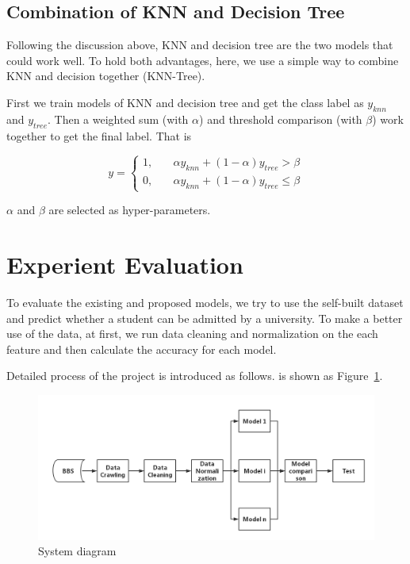 \documentclass{article}
\begin{document}
\subsection{Combination of KNN and Decision Tree}

Following the discussion above, KNN and decision tree are the two models that could work well. To hold both advantages, here, we use a simple way to combine KNN and decision together (KNN-Tree).

First we train models of KNN and decision tree and get the class label as $y_{knn}$ and $y_{tree}$. Then a weighted sum (with $\alpha$) and threshold comparison (with $\beta$) work together to get the final label. That is

\begin{equation*}
    y=\left\{
    \begin{aligned}
        1,\quad & \alpha y_{knn}+(1-\alpha)y_{tree}>\beta\\
        0,\quad & \alpha y_{knn}+(1-\alpha)y_{tree}\le\beta
    \end{aligned}\right.
\end{equation*}

$\alpha$ and $\beta$ are selected as hyper-parameters.


\section{Experient Evaluation}

To evaluate the existing and proposed models, we try to use the self-built dataset and predict whether a student can be admitted by a university. To make a better use of the data, at first, we run data cleaning and normalization on the each feature and then calculate the accuracy for each model.

Detailed process of the project is introduced as follows. is shown as Figure~\ref{fig: Diagram}.

\begin{figure}[htbp]
\centering
\includegraphics[width = 14cm]{Diagram}
\caption{System diagram}
\label{fig: Diagram}
\end{figure}
\end{document}
